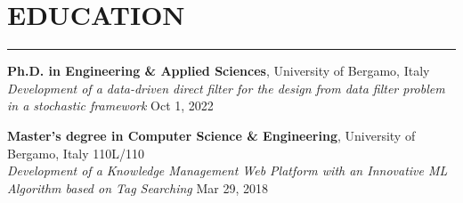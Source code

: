 \documentclass[10pt]{article}
\newcommand{\cvsection}[1]{\section*{\centering\normalsize\uppercase{#1}}\vspace{-16pt}\rule{\linewidth}{0.2pt}\vspace{6pt}}
\begin{document}
\vspace{-10pt}
\cvsection{education}
\textbf{Ph.D. in Engineering \& Applied Sciences}, University of Bergamo, Italy\\
\textit{Development of a data-driven direct filter for the design from data filter problem in a stochastic framework} \hfill Oct 1, 2022\\

\vspace{-10pt}

\textbf{Master's degree in Computer Science \& Engineering}, University of Bergamo, Italy \hfill 110L\slash110\\
\textit{Development of a Knowledge Management Web Platform with an Innovative ML Algorithm based on Tag Searching} \hfill Mar 29, 2018\\

\vspace{-10pt}
\end{document}
